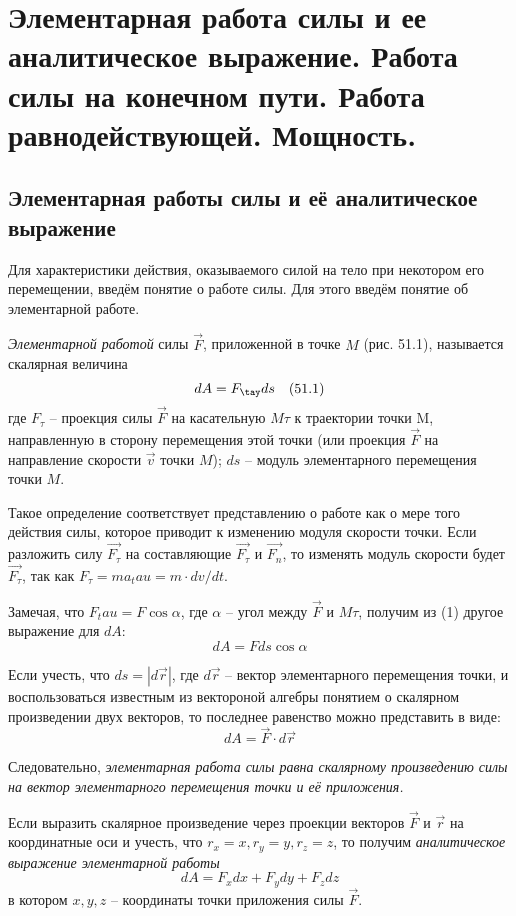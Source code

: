 \chapter{Элементарная работа силы и ее аналитическое выражение. Работа силы на
конечном пути. Работа равнодействующей. Мощность.}

\section{Элементарная работы силы и её аналитическое выражение}
Для характеристики действия, оказываемого силой на тело при некотором его 
перемещении, введём понятие о работе силы. Для этого введём понятие об 
элементарной работе.

\emph{Элементарной работой} силы \( \vec{F} \), приложенной в точке 
\( M \) (рис. 51.1), называется скалярная величина
\[ dA = F_\tay ds \quad (51.1) \]
где \( F_\tau \) -- проекция силы \( \vec{F} \) на касательную \( M\tau \) 
к траектории точки M, направленную в сторону перемещения этой точки 
(или проекция \( \vec{F} \) на направление скорости \( \vec{v} \) точки 
\( M \)); \( ds \) -- модуль элементарного перемещения точки \( M \).

Такое определение соответствует представлению о работе как о мере того 
действия силы, которое приводит к изменению модуля скорости точки. Если 
разложить силу \( \vec{F_\tau} \) на составляющие \( \vec{F_\tau} \) и 
\( \vec{F_n} \), то изменять модуль скорости будет \( \vec{F_\tau} \), 
так как \( F_\tau = ma_tau = m\cdot dv/dt \).

Замечая, что \( F_tau = F\cos\alpha \), где \( \alpha \) -- угол между 
\( \vec{F} \) и \( M\tau \), получим из (1) другое выражение для \( dA \):
\[ dA = Fds\cos\alpha \]

Если учесть, что \( ds = |d\vec{r}| \), где \( d\vec{r} \) -- вектор 
элементарного перемещения точки, и воспользоваться известным из вектороной 
алгебры понятием о скалярном произведении двух векторов, то последнее 
равенство можно представить в виде:
\[ dA = \vec{F}\cdot d\vec{r} \]

Следовательно, \emph{элементарная работа силы равна скалярному произведению 
силы на вектор элементарного перемещения точки и её приложения.}

Если выразить скалярное произведение через проекции векторов \( \vec{F} \) 
и \( \vec{r} \) на координатные оси и учесть, что 
\( r_x = x, r_y = y, r_z = z \), то получим \emph{аналитическое выражение 
элементарной работы}
\[ dA = F_x dx + F_y dy + F_z dz \]
в котором \( x, y, z \) -- координаты точки приложения силы \( \vec{F} \).

